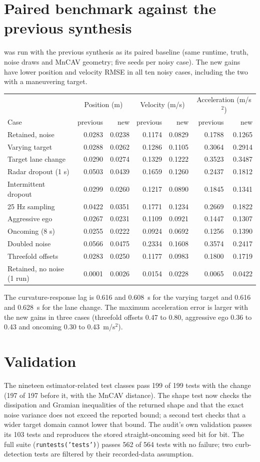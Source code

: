\documentclass[11pt]{article}
\begin{document}
\section{Paired benchmark against the previous synthesis}
 was run with the previous synthesis
as its paired baseline (same runtime, truth, noise draws and MnCAV geometry;
five seeds per noisy case). The new gains have lower position and velocity
RMSE in all ten noisy cases, including the two with a maneuvering target.
\begin{center}\small
\begin{tabular}{@{}lrrrrrr@{}}
\toprule
&\multicolumn{2}{c}{Position (m)}&\multicolumn{2}{c}{Velocity (m/s)}&\multicolumn{2}{c}{Acceleration (m/s$^2$)}\\
Case&previous&new&previous&new&previous&new\\
\midrule
Retained, noise&0.0283&0.0238&0.1174&0.0829&0.1788&0.1265\\
Varying target&0.0288&0.0262&0.1286&0.1105&0.3064&0.2914\\
Target lane change&0.0290&0.0274&0.1329&0.1222&0.3523&0.3487\\
Radar dropout (1 s)&0.0503&0.0439&0.1659&0.1260&0.2437&0.1812\\
Intermittent dropout&0.0299&0.0260&0.1217&0.0890&0.1845&0.1341\\
25 Hz sampling&0.0422&0.0351&0.1771&0.1234&0.2669&0.1822\\
Aggressive ego&0.0267&0.0231&0.1109&0.0921&0.1447&0.1307\\
Oncoming (8 s)&0.0255&0.0222&0.0924&0.0692&0.1256&0.1390\\
Doubled noise&0.0566&0.0475&0.2334&0.1608&0.3574&0.2417\\
Threefold offsets&0.0283&0.0250&0.1177&0.0983&0.1800&0.1719\\
Retained, no noise (1 run)&0.0001&0.0026&0.0154&0.0228&0.0065&0.0422\\
\bottomrule
\end{tabular}\end{center}
The curvature-response lag is 0.616 and 0.608~s for the varying target and
0.616 and 0.628~s for the lane change. The maximum acceleration error is
larger with the new gains in three cases (threefold offsets 0.47 to 0.80,
aggressive ego 0.36 to 0.43 and oncoming 0.30 to 0.43~m/s$^2$).

\section{Validation}
The nineteen estimator-related test classes pass 199 of 199 tests with the
change (197 of 197 before it, with the MnCAV distance). The shape test now
checks the dissipation and Gramian inequalities of the returned shape and
that the exact noise variance does not exceed the reported bound; a second
test checks that a wider target domain cannot lower that bound. The audit's
own validation passes its 103 tests and reproduces the stored
straight-oncoming seed bit for bit. The full
suite (\texttt{runtests('tests')}) passes 562 of 564 tests with no failure; two
curb-detection tests are filtered by their recorded-data assumption.
\end{document}
